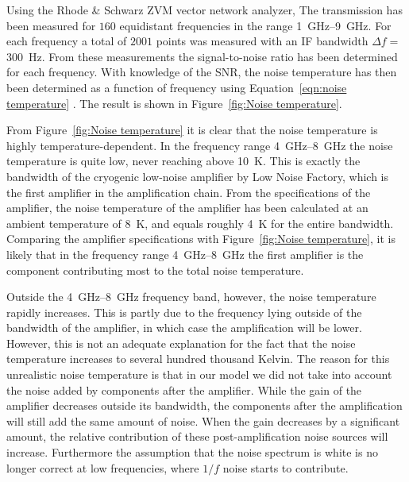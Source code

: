 \documentclass[12pt]{report}
\begin{document}
Using the Rhode \& Schwarz ZVM vector network analyzer, The transmission has been measured for $160$ equidistant frequencies in the range \SIrange{1}{9}{\giga \hertz}. For each frequency a total of $2001$ points was measured with an IF bandwidth $\Delta f = $ \SI{300}{\hertz}. From these measurements the signal-to-noise ratio has been determined for each frequency. With knowledge of the SNR, the noise temperature has then been determined as a function of frequency using Equation~\ref{eqn:noise temperature} . The result is shown in Figure~\ref{fig:Noise temperature}.

From Figure~\ref{fig:Noise temperature} it is clear that the noise temperature is highly temperature-dependent. In the frequency range \SIrange{4}{8}{\giga \hertz} the noise temperature is quite low, never reaching above \SI{10}{\kelvin}. This is exactly the bandwidth of the cryogenic low-noise amplifier by Low Noise Factory, which is the first amplifier in the amplification chain. From the specifications of the amplifier, the noise temperature of the amplifier has been calculated at an ambient temperature of \SI{8}{\kelvin}, and equals roughly \SI{4}{\kelvin} for the entire bandwidth. Comparing the amplifier specifications with Figure~\ref{fig:Noise temperature}, it is likely that in the frequency range \SIrange{4}{8}{\giga \hertz} the first amplifier is the component contributing most to the total noise temperature.

Outside the \SIrange{4}{8}{\giga \hertz} frequency band, however, the noise temperature rapidly increases. This is partly due to the frequency lying outside of the bandwidth of the amplifier, in which case the amplification will be lower. However, this is not an adequate explanation for the fact that the noise temperature increases to several hundred thousand Kelvin. The reason for this unrealistic noise temperature is that in our model we did not take into account the noise added by components after the amplifier. While the gain of the amplifier decreases outside its bandwidth, the components after the amplification will still add the same amount of noise. When the gain decreases by a significant amount, the relative contribution of these post-amplification noise sources will increase. Furthermore the assumption that the noise spectrum is white is no longer correct at low frequencies, where $1/f$ noise starts to contribute.
\end{document}

